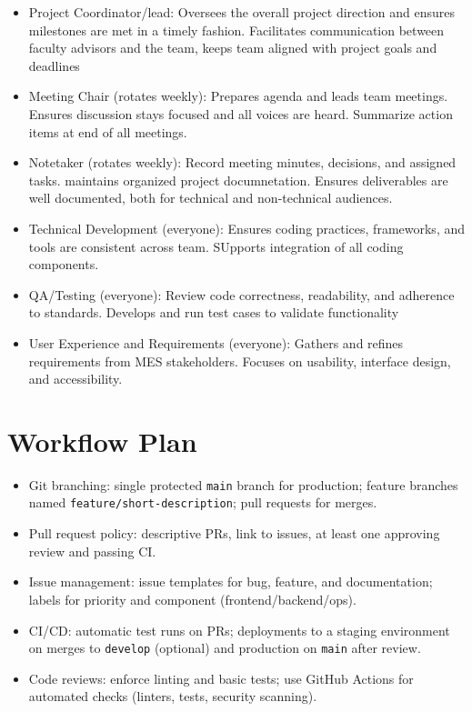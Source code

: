 \documentclass{article}
\begin{document}
\begin{itemize}
  \item Project Coordinator/lead: Oversees the overall project direction and ensures milestones are met in a timely fashion. Facilitates communication between faculty advisors and the team, keeps team aligned with project goals and deadlines
  \item Meeting Chair (rotates weekly): Prepares agenda and leads team meetings. Ensures discussion stays focused and all voices are heard. Summarize action items at end of all meetings.
  \item Notetaker (rotates weekly): Record meeting minutes, decisions, and assigned tasks. maintains organized project documnetation. Ensures deliverables are well documented, both for technical and non-technical audiences.
  \item Technical Development (everyone): Ensures coding practices, frameworks, and tools are consistent across team. SUpports integration of all coding components.
  \item QA/Testing (everyone): Review code correctness, readability, and adherence to standards. Develops and run test cases to validate functionality
  \item User Experience and Requirements (everyone): Gathers and refines requirements from MES stakeholders. Focuses on usability, interface design, and accessibility. 
\end{itemize}

\section{Workflow Plan}

\begin{itemize}
  \item Git branching: single protected \texttt{main} branch for production; feature branches named \texttt{feature/short-description}; pull requests for merges.
  \item Pull request policy: descriptive PRs, link to issues, at least one approving review and passing CI.
  \item Issue management: issue templates for bug, feature, and documentation; labels for priority and component (frontend/backend/ops).
  \item CI/CD: automatic test runs on PRs; deployments to a staging environment on merges to \texttt{develop} (optional) and production on \texttt{main} after review.
  \item Code reviews: enforce linting and basic tests; use GitHub Actions for automated checks (linters, tests, security scanning).
\end{itemize}
\end{document}
